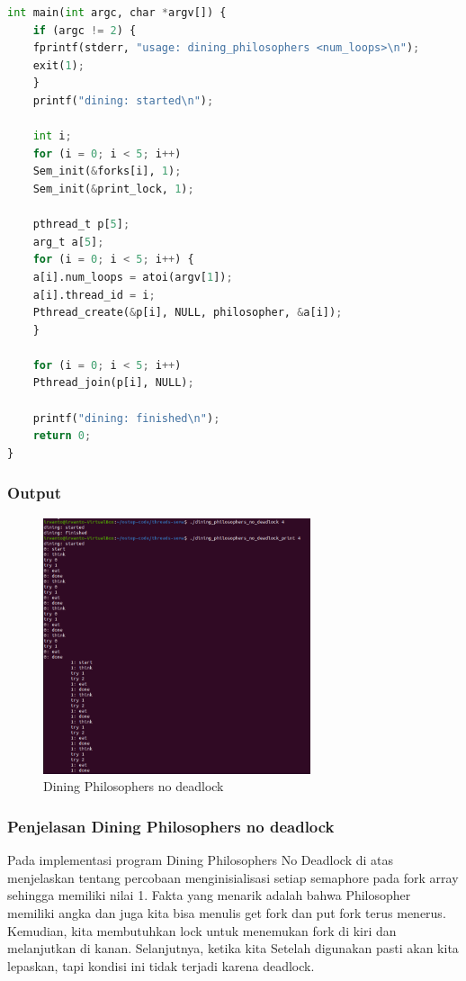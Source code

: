 \documentclass[11pt,a4paper]{article}
\begin{document}
\begin{lstlisting}[language=Python, caption=source code no deadlock,label={labelkode}]
int main(int argc, char *argv[]) {
    if (argc != 2) {
	fprintf(stderr, "usage: dining_philosophers <num_loops>\n");
	exit(1);
    }
    printf("dining: started\n");
    
    int i;
    for (i = 0; i < 5; i++) 
	Sem_init(&forks[i], 1);
    Sem_init(&print_lock, 1);

    pthread_t p[5];
    arg_t a[5];
    for (i = 0; i < 5; i++) {
	a[i].num_loops = atoi(argv[1]);
	a[i].thread_id = i;
	Pthread_create(&p[i], NULL, philosopher, &a[i]);
    }

    for (i = 0; i < 5; i++) 
	Pthread_join(p[i], NULL); 

    printf("dining: finished\n");
    return 0;
}
    \end{lstlisting}

\newpage
\subsubsection{Output}
\begin{figure}[h]
    \centering
    \includegraphics[width=0.7\textwidth]{Figure/5benar2.png}
    \caption{Dining Philosophers no deadlock}
    \label{fig:my_label}
\end{figure}

\subsubsection{Penjelasan Dining Philosophers no deadlock}
Pada implementasi program Dining Philosophers No Deadlock di atas menjelaskan tentang percobaan menginisialisasi setiap semaphore pada fork array sehingga memiliki nilai 1. Fakta yang menarik adalah bahwa Philosopher memiliki angka dan juga kita bisa menulis get fork dan put fork terus menerus. Kemudian, kita membutuhkan lock untuk menemukan fork di kiri dan melanjutkan di kanan. Selanjutnya, ketika kita Setelah digunakan pasti akan kita lepaskan, tapi kondisi ini tidak terjadi karena deadlock.
\end{document}
